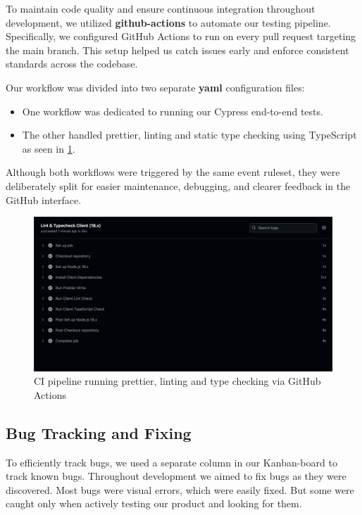 To maintain code quality and ensure continuous integration throughout development, we utilized \textbf{\gls{github-actions}} to automate our testing pipeline. Specifically, we configured GitHub Actions to run on every pull request targeting the main branch. This setup helped us catch issues early and enforce consistent standards across the codebase.

Our workflow was divided into two separate \textbf{\gls{yaml}} configuration files:
\begin{itemize}
    \item One workflow was dedicated to running our Cypress end-to-end tests.
    \item The other handled prettier, linting and static type checking using TypeScript as seen in \ref{fig:lint_typecheck_ci}.
\end{itemize}

Although both workflows were triggered by the same event ruleset, they were deliberately split for easier maintenance, debugging, and clearer feedback in the GitHub interface.

\begin{figure}[H]
    \centering
    \includegraphics[width=1\linewidth]{figures/lint_typecheck_ci.png}
    \caption{CI pipeline running prettier, linting and type checking via GitHub Actions}
    \label{fig:lint_typecheck_ci}
\end{figure}



\subsection{Bug Tracking and Fixing}
To efficiently track bugs, we used a separate column in our Kanban-board to track known bugs. Throughout development we aimed to fix bugs as they were discovered.
Most bugs were visual errors, which were easily fixed. But some were caught only when actively testing our product and looking for them.


